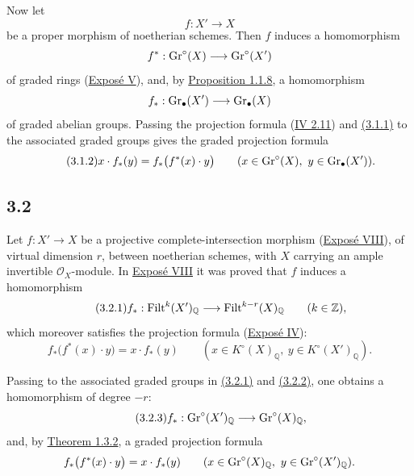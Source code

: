 Now let
\[
f:X'\longrightarrow X
\]
be a proper morphism of noetherian schemes. Then $f$ induces a homomorphism
\[
f^*:\operatorname{Gr}^{\circ}(X)\longrightarrow\operatorname{Gr}^{\circ}(X')
\]
of graded rings (\hyperlink{sga6.e05.expose}{Expos\'e V}), and, by \hyperlink{sga6.e10.prop.1-1-8}{Proposition 1.1.8}, a homomorphism
\[
f_*:\operatorname{Gr}_{\bullet}(X')\longrightarrow\operatorname{Gr}_{\bullet}(X)
\]
of graded abelian groups. Passing the projection formula (\hyperlink{sga6.e04.para.2-11}{IV 2.11}) and
\hyperlink{sga6.e10.eq.3-1-1}{(3.1.1)} to the associated graded groups gives the graded projection formula
\begin{equation}\tag{3.1.2}
x\cdot f_*(y)=f_*\bigl(f^*(x)\cdot y\bigr)
\qquad(x\in\operatorname{Gr}^{\circ}(X),\ y\in\operatorname{Gr}_{\bullet}(X')).
\end{equation}

\subsection*{3.2}
Let $f:X'\to X$ be a projective complete-intersection morphism (\hyperlink{sga6.e08.expose}{Expos\'e
VIII}), of virtual dimension $r$, between noetherian schemes, with $X$ carrying
an ample invertible $\mathcal O_X$-module. In \hyperlink{sga6.e08.expose}{Expos\'e VIII} it was proved that
$f$ induces a homomorphism
\begin{equation}\tag{3.2.1}
f_*:\operatorname{Filt}^k(X')_{\mathbb Q}\longrightarrow
\operatorname{Filt}^{k-r}(X)_{\mathbb Q}\qquad(k\in\mathbb Z),
\end{equation}
which moreover satisfies the projection formula (\hyperlink{sga6.e04.expose}{Expos\'e IV}):
\begin{equation}\tag{3.2.2}
f_*\bigl(f^*(x)\cdot y\bigr)=x\cdot f_*(y)
\qquad(x\in K^\circ(X)_{\mathbb Q},\ y\in K^\circ(X')_{\mathbb Q}).
\end{equation}

Passing to the associated graded groups in \hyperlink{sga6.e10.eq.3-2-1}{(3.2.1)} and \hyperlink{sga6.e10.eq.3-2-2}{(3.2.2)}, one obtains a
homomorphism of degree $-r$:
\begin{equation}\tag{3.2.3}
f_*:\operatorname{Gr}^{\circ}(X')_{\mathbb Q}\longrightarrow\operatorname{Gr}^{\circ}(X)_{\mathbb Q},
\end{equation}
and, by \hyperlink{sga6.e10.thm.1-3-2}{Theorem 1.3.2}, a graded projection formula
\[
f_*\bigl(f^*(x)\cdot y\bigr)=x\cdot f_*(y)
\qquad(x\in\operatorname{Gr}^{\circ}(X)_{\mathbb Q},\ y\in\operatorname{Gr}^{\circ}(X')_{\mathbb Q}).
\]

